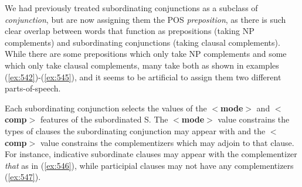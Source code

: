 \beginsentences
{}\label{ex:539} 
\label{ex:540} 
\label{ex:541} 
\endsentences

 
 
We had previously treated subordinating conjunctions as a subclass of 
{\em conjunction}, but are now assigning them the POS {\em preposition}, as there is such clear overlap between words that 
function as prepositions (taking NP complements) and subordinating 
conjunctions (taking clausal complements). While there are some 
prepositions which only take NP complements and some which only take 
clausal complements, many take both as shown in examples 
(\ref{ex:542})-(\ref{ex:545}), and it seems to be artificial to assign them two 
different parts-of-speech. 
 
\beginsentences
{}\label{ex:542} 
\label{ex:543} 
\label{ex:544} 
\label{ex:545} 
\endsentences

 
Each subordinating conjunction selects the values of the {\bf $<$mode$>$} and {\bf $<$comp$>$} features of the subordinated S. The 
{\bf $<$mode$>$} value constrains the types of clauses the 
subordinating conjunction may appear with and the {\bf $<$comp$>$} 
value constrains the complementizers which may adjoin to that 
clause. For instance, indicative subordinate clauses may appear with 
the complementizer {\it that} as in (\ref{ex:546}), while participial 
clauses may not have any complementizers (\ref{ex:547}). 
 
\beginsentences
{}\label{ex:546} 
\label{ex:547} 
\endsentences

